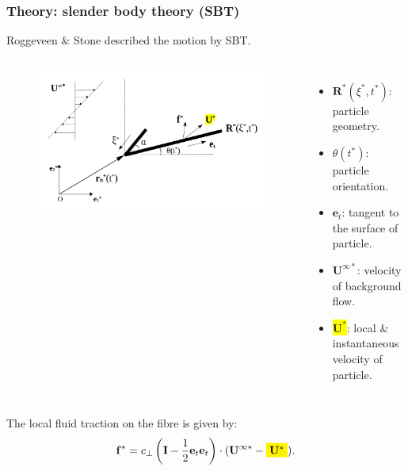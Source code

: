 \documentclass{beamer}
\newcommand{\bi}{\begin{itemize}}
\newcommand{\ei}{\end{itemize}}
\begin{document}

\begin{frame}
	\frametitle{Theory: slender body theory (SBT)}
	\begin{overlayarea}{\textwidth}{\textheight}
		\vspace{-0.5cm}\small Roggeveen $\&$ Stone described the motion by SBT. \normalsize
		\begin{columns}
			\begin{figure}[htb]
				\begin{center}
					\includegraphics[width=1\textwidth]{plots/schematic/schematic_rigid_configuration_color5.png}
				\end{center}
			\end{figure}
			\small \bi 
			\item $\mathbf{R}^*(\xi^*,t^*)$: particle geometry.
			\item $\theta(t^*)$: particle orientation.
			\item $\mathbf{e}_t$: tangent to the surface of particle.
			\item $\mathbf{U}^{\infty*}$: velocity of background flow.
			\item \colorbox{yellow}{$\mathbf{U}^*$}: local $\&$ instantaneous velocity of particle.
			\ei
		\end{columns}\vspace{0.5cm}
		The local fluid traction on the fibre is given by: 
		\begin{equation*}
			\mathbf{f}^*=c_\perp\left(\mathbf{I}-\frac{1}{2}\mathbf{e}_t\mathbf{e}_t\right)\cdot(\mathbf{U}^{\infty*}-\colorbox{yellow}{$\mathbf{U}^*$}).
		\end{equation*}
	\end{overlayarea}
\end{frame}
\end{document}
